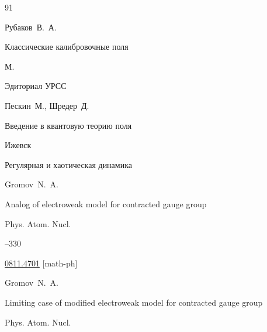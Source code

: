 \begin{thebibliography}{91}


\by  Рубаков~В.~А. 

\book  Классические калибровочные поля

\publaddr М.

\publ Эдиториал УРСС









\by Пескин~М., Шредер~Д. 

\book Введение в квантовую теорию поля

\publaddr Ижевск

\publ Регулярная и хаотическая динамика







\by Gromov~N.~A.

\paper Analog of electroweak model for contracted gauge group

\jour Phys. Atom. Nucl.




--330

\arxiv \href{http://arxiv.org/abs/0811.4701}{0811.4701} [math-ph] 










\by Gromov~N.~A.

\paper  Limiting case of modified electroweak model for contracted gauge group 

\jour Phys. Atom. Nucl.




\end{thebibliography}

